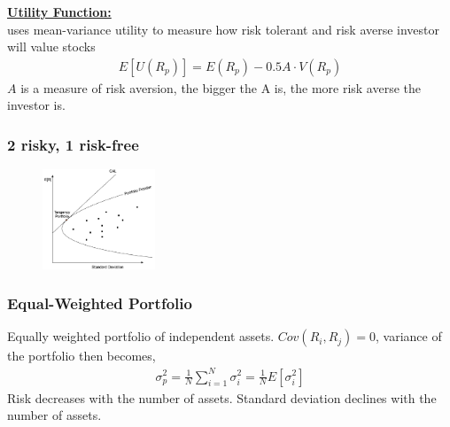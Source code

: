 \begin{multicols}{2}
\underline{\textbf{Utility Function:}}\\
uses mean-variance utility to measure how risk tolerant and risk averse investor will value stocks
\begin{gather*}
    E[U(R_p)] = E(R_p)-0.5A\cdot V(R_p)
\end{gather*}
$A$ is a measure of risk aversion, the bigger the A is, the more risk averse the investor is. 

\subsubsection{2 risky, 1 risk-free}
\begin{figure}[H]
    \centering
    \includegraphics[width =0.3\textwidth]{Figure/cal.png}
\end{figure}
\subsubsection{Equal-Weighted Portfolio}
Equally weighted portfolio of independent assets. $Cov(R_i,R_j)=0$, variance of the portfolio then becomes, 
\begin{gather*}
    \sigma_p^2 = \frac{1}{N}\sum_{i=1}^{N}\sigma_i^2 = \frac{1}{N}E[\sigma_i^2]
\end{gather*}
Risk decreases with the number of assets. Standard deviation declines with the number of assets.


\end{multicols}